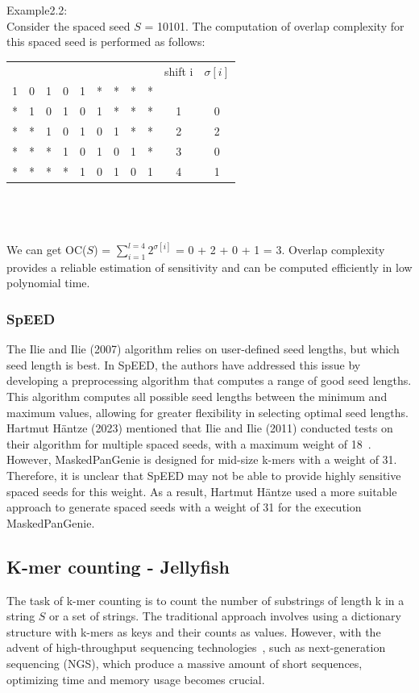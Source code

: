 \documentclass{PHlab-thesis}
\begin{document}
Example2.2:\\
Consider the spaced seed $S$ = 10101. The computation of overlap complexity for this spaced seed is performed as follows:\\  
\begin{tabular}{ccccccccccc}
  &   &   &   &   &   &   &   &   & shift i & $\sigma[i]$ \\
1 & 0 & 1 & 0 & 1 & * & * & * & *  &         &            \\
* & 1 & 0 & 1 & 0 & 1 & * & * & *  &   1     &     0      \\
* & * & 1 & 0 & 1 & 0 & 1 & * & *  &   2     &     2       \\
* & * & * & 1 & 0 & 1 & 0 & 1 & *  &   3     &     0        \\
* & * & * & * & 1 & 0 & 1 & 0 & 1  &   4     &     1        \\
\end{tabular}\\\\\\
We can get OC($S$) = $\sum\limits_{i = 1}^{l = 4}2^{\sigma[i]}$ = 0 + 2 + 0 + 1 = 3. Overlap complexity provides a reliable estimation of sensitivity and can be computed efficiently in low polynomial time. 
\subsubsection{SpEED}
The Ilie and Ilie (2007) algorithm relies on user-defined seed lengths, but which seed length is best. In SpEED, the authors have addressed this issue by developing a preprocessing algorithm that computes a range of good seed lengths. This algorithm computes all possible seed lengths between the minimum and maximum values, allowing for greater flexibility in selecting optimal seed lengths. Hartmut Häntze (2023) mentioned that Ilie and Ilie (2011) conducted tests on their algorithm for multiple spaced seeds, with a maximum weight of 18~\cite{haimo2023MaskedPanGenie}. However, MaskedPanGenie is designed for mid-size k-mers with a weight of 31. Therefore, it is unclear that SpEED may not be able to provide highly sensitive spaced seeds for this weight. As a result,  Hartmut Häntze used a more suitable approach to generate spaced seeds with a weight of 31 for the execution MaskedPanGenie.
\subsection{K-mer counting - Jellyfish}
The task of k-mer counting is to count the number of substrings of length k in a string $S$ or a set of strings. The traditional approach involves using a dictionary structure with k-mers as keys and their counts as values. However, with the advent of high-throughput sequencing technologies~\cite{Reu2015Sequencing}, such as next-generation sequencing (NGS), which produce a massive amount of short sequences, optimizing time and memory usage becomes crucial.
\end{document}

